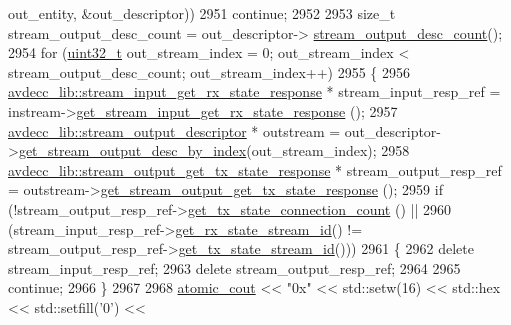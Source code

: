 \begin{DoxyCode}
      out\_entity, &out\_descriptor))
2951                     \textcolor{keywordflow}{continue};
2952 
2953                 \textcolor{keywordtype}{size\_t} stream\_output\_desc\_count = out\_descriptor->
      \hyperlink{classavdecc__lib_1_1configuration__descriptor_a9ebee6c612e3cfec50f5168790bd265c}{stream\_output\_desc\_count}();
2954                 \textcolor{keywordflow}{for} (\hyperlink{parse_8c_a6eb1e68cc391dd753bc8ce896dbb8315}{uint32\_t} out\_stream\_index = 0; out\_stream\_index < stream\_output\_desc\_count; 
      out\_stream\_index++)
2955                 \{
2956                     \hyperlink{classavdecc__lib_1_1stream__input__get__rx__state__response}{avdecc\_lib::stream\_input\_get\_rx\_state\_response}
       * stream\_input\_resp\_ref = instream->\hyperlink{classavdecc__lib_1_1stream__input__descriptor_a16a103984d891491a224e518ace35b06}{get\_stream\_input\_get\_rx\_state\_response}
      ();
2957                     \hyperlink{classavdecc__lib_1_1stream__output__descriptor}{avdecc\_lib::stream\_output\_descriptor} * outstream = 
      out\_descriptor->\hyperlink{classavdecc__lib_1_1configuration__descriptor_a300ea5957342e2e9579318135da02856}{get\_stream\_output\_desc\_by\_index}(out\_stream\_index);
2958                     \hyperlink{classavdecc__lib_1_1stream__output__get__tx__state__response}{avdecc\_lib::stream\_output\_get\_tx\_state\_response}
       * stream\_output\_resp\_ref = outstream->\hyperlink{classavdecc__lib_1_1stream__output__descriptor_ad352ecf636c3497e245f402b2a369f51}{get\_stream\_output\_get\_tx\_state\_response}
      ();
2959                     \textcolor{keywordflow}{if} (!stream\_output\_resp\_ref->\hyperlink{classavdecc__lib_1_1stream__output__get__tx__state__response_aa12c38f566d4d5f8263278d2f926ae68}{get\_tx\_state\_connection\_count}
      () ||
2960                         (stream\_input\_resp\_ref->\hyperlink{classavdecc__lib_1_1stream__input__get__rx__state__response_aa778838fbcebe5544f9914a8e58a4d59}{get\_rx\_state\_stream\_id}() != 
      stream\_output\_resp\_ref->\hyperlink{classavdecc__lib_1_1stream__output__get__tx__state__response_a70413bbd0422049658122c5103e0d948}{get\_tx\_state\_stream\_id}()))
2961                     \{
2962                         \textcolor{keyword}{delete} stream\_input\_resp\_ref;
2963                         \textcolor{keyword}{delete} stream\_output\_resp\_ref;
2964 
2965                         \textcolor{keywordflow}{continue};
2966                     \}
2967 
2968                     \hyperlink{cmd__line_8h_a0bc38ccc65c79ba06c6fcd7b4bf554c3}{atomic\_cout} << \textcolor{stringliteral}{"0x"} << std::setw(16) << std::hex << std::setfill(\textcolor{charliteral}{'0'}) << 

\end{DoxyCode}
